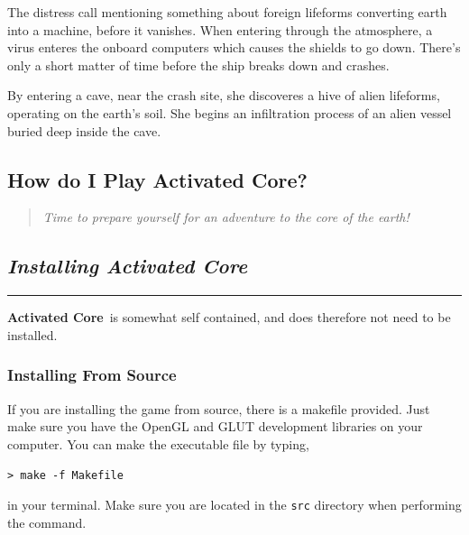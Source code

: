 \documentclass[a5paper, 10pt, titlepage, landscape, twoside, final]{article}
\newcommand{\ac}{\textbf{Activated Core}}
\begin{document}
The distress call mentioning something about foreign lifeforms converting earth into a machine, before it vanishes. When entering through the atmosphere, a virus enteres the onboard computers which causes the shields to go down. There's only a short matter of time before the ship breaks down and crashes.

By entering a cave, near the crash site, she discoveres a hive of alien lifeforms, operating on the earth's soil. She begins an infiltration process of an alien vessel buried deep inside the cave.





\clearpage
\begin{center}
\section{How do I Play \ac?}
\end{center}
%
\begin{quote}
  \centering
  \large{\textit{Time to prepare yourself for an adventure to the core of the earth!}}
\end{quote}

\begin{center}
\subsection{\textit{Installing \ac}}
\end{center}
\hrule\par
%
\ac\ is somewhat self contained, and does therefore not need to be installed.

\subsubsection{Installing From Source}
If you are installing the game from source, there is a makefile provided. Just make sure you have the OpenGL and GLUT development libraries on your computer. You can make the executable file by typing,\par
\texttt{> make -f Makefile}
\par
in your terminal. Make sure you are located in the \texttt{src} directory when performing the command.
\end{document}
